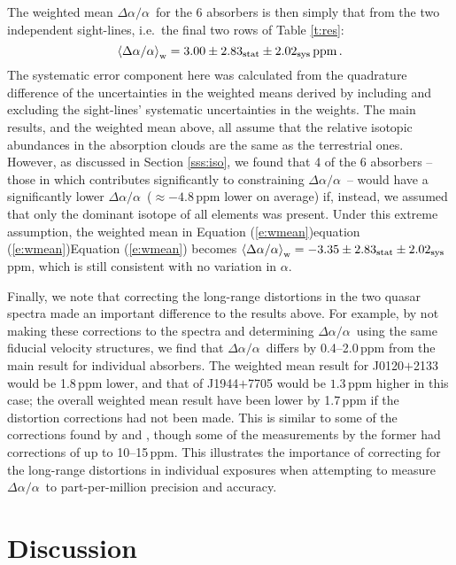 \documentclass[fleqn,usenatbib,usedcolumn]{mnras}
\newcommand{\Sref}[1]{Section \ref{#1}}
\newcommand{\Tref}[1]{Table \ref{#1}}
\newcommand{\Eref}[1]{\ifhmode \ifnum\spacefactor=1001 Equation (\ref{#1})\else equation (\ref{#1})\fi \else Equation (\ref{#1})\fi}
\newcommand{\daa}{\ensuremath{\Delta\alpha/\alpha}}
\begin{document}
The weighted mean \daa\ for the 6 absorbers is then simply that from the two independent sight-lines, i.e.\ the final two rows of \Tref{t:res}:
\begin{equation}\label{e:wmean}
\left<\daa\right>_{\rm w} = 3.00 \pm 2.83_{\rm stat} \pm 2.02_{\rm sys}\,{\rm ppm}\,.
\end{equation}
The systematic error component here was calculated from the quadrature difference of the uncertainties in the weighted means derived by including and excluding the sight-lines' systematic uncertainties in the weights. The main results, and the weighted mean above, all assume that the relative isotopic abundances in the absorption clouds are the same as the terrestrial ones. However, as discussed in \Sref{sss:iso}, we found that 4 of the 6 absorbers -- those in which  contributes significantly to constraining \daa\ -- would have a significantly lower \daa\ ($\approx-4.8$\,ppm lower on average) if, instead, we assumed that only the dominant isotope of all elements was present. Under this extreme assumption, the weighted mean in \Eref{e:wmean} becomes
$\left<\daa\right>_{\rm w} = -3.35 \pm 2.83_{\rm stat} \pm 2.02_{\rm sys}$\,ppm, which is still consistent with no variation in $\alpha$.

Finally, we note that correcting the long-range distortions in the two quasar spectra made an important difference to the results above. For example, by not making these corrections to the spectra and determining \daa\ using the same fiducial velocity structures, we find that \daa\ differs by 0.4--2.0\,ppm from the main result for individual absorbers. The weighted mean result for J0120$+$2133 would be 1.8\,ppm lower, and that of J1944$+$7705 would be $1.3$\,ppm higher in this case; the overall weighted mean result have been lower by 1.7\,ppm if the distortion corrections had not been made. This is similar to some of the corrections found by \citet{Evans:2014:128} and \citet{Kotus:2017:3679}, though some of the measurements by the former had corrections of up to 10--15\,ppm. This illustrates the importance of correcting for the long-range distortions in individual exposures when attempting to measure \daa\ to part-per-million precision and accuracy.


\section{Discussion}\label{s:disc}
\end{document}

